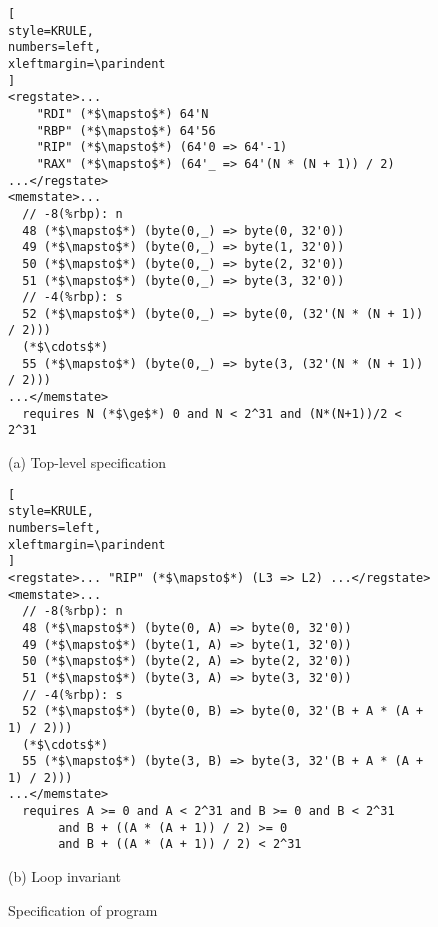 

\setlength{\textfloatsep}{1\baselineskip plus 0.2\baselineskip minus 0.5\baselineskip}
\begin{figure}
\begin{lstlisting}[
style=KRULE,
numbers=left,
xleftmargin=\parindent
]
<regstate>... 
    "RDI" (*$\mapsto$*) 64'N
    "RBP" (*$\mapsto$*) 64'56
    "RIP" (*$\mapsto$*) (64'0 => 64'-1) 
    "RAX" (*$\mapsto$*) (64'_ => 64'(N * (N + 1)) / 2)
...</regstate>
<memstate>...
  // -8(%rbp): n
  48 (*$\mapsto$*) (byte(0,_) => byte(0, 32'0))
  49 (*$\mapsto$*) (byte(0,_) => byte(1, 32'0))
  50 (*$\mapsto$*) (byte(0,_) => byte(2, 32'0))
  51 (*$\mapsto$*) (byte(0,_) => byte(3, 32'0))
  // -4(%rbp): s
  52 (*$\mapsto$*) (byte(0,_) => byte(0, (32'(N * (N + 1)) / 2)))
  (*$\cdots$*)
  55 (*$\mapsto$*) (byte(0,_) => byte(3, (32'(N * (N + 1)) / 2)))
...</memstate>
  requires N (*$\ge$*) 0 and N < 2^31 and (N*(N+1))/2 < 2^31
\end{lstlisting}
\vspace{-5pt}
\begin{center}
{\small (a) Top-level specification}
\end{center}
\begin{lstlisting}[
style=KRULE,
numbers=left,
xleftmargin=\parindent
]
<regstate>... "RIP" (*$\mapsto$*) (L3 => L2) ...</regstate>
<memstate>...
  // -8(%rbp): n
  48 (*$\mapsto$*) (byte(0, A) => byte(0, 32'0))
  49 (*$\mapsto$*) (byte(1, A) => byte(1, 32'0))
  50 (*$\mapsto$*) (byte(2, A) => byte(2, 32'0))
  51 (*$\mapsto$*) (byte(3, A) => byte(3, 32'0))
  // -4(%rbp): s
  52 (*$\mapsto$*) (byte(0, B) => byte(0, 32'(B + A * (A + 1) / 2)))
  (*$\cdots$*)
  55 (*$\mapsto$*) (byte(3, B) => byte(3, 32'(B + A * (A + 1) / 2)))
...</memstate>
  requires A >= 0 and A < 2^31 and B >= 0 and B < 2^31
       and B + ((A * (A + 1)) / 2) >= 0  
       and B + ((A * (A + 1)) / 2) < 2^31
\end{lstlisting}
\vspace{-5pt}
\begin{center}
{\small (b) Loop invariant}
\end{center}
\vspace{-5pt}
\caption{Specification of  program}
\label{fig:sum-to-n-spec}
\end{figure}

